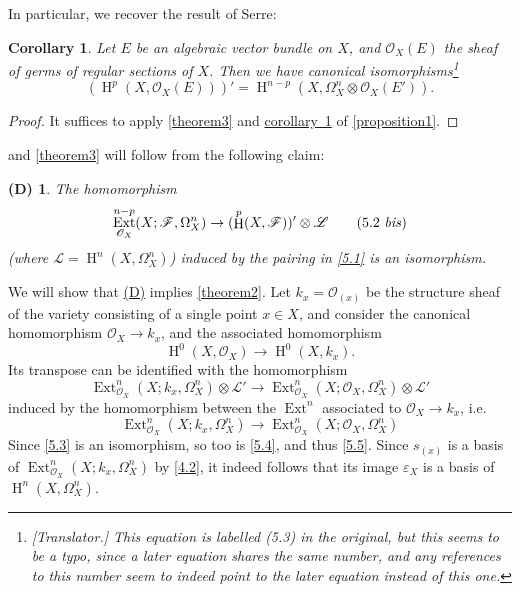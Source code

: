 \documentclass{article}
\theoremstyle{plain}
\newtheorem*{corollary*}{Corollary}
\newtheorem*{denv}{(D)}
\theoremstyle{definition}
\newcommand{\sh}{\mathscr}
\DeclareMathOperator{\Ext}{Ext}
\DeclareMathOperator{\HH}{H}
\newcommand{\oldpage}[1]{\marginpar{\footnotesize$\Big\vert$ \textit{p.~#1}}}
\begin{document}
In particular, we recover the result of Serre:

\begin{corollary*}
\label{theorem3corollary}
  \renewcommand*{\thefootnote}{\fnsymbol{footnote}}
  Let $E$ be an algebraic vector bundle on $X$, and $\sh{O}_X(E)$ the sheaf of germs of regular sections of $X$.
  Then we have canonical isomorphisms\footnote{\emph{[Translator.] This equation is labelled (5.3) in the original, but this seems to be a typo, since a later equation shares the same number, and any references to this number seem to indeed point to the later equation instead of this one.}}
  \[
    (\HH^p(X,\sh{O}_X(E)))' = \HH^{n-p}(X,\Omega_X^n\otimes\sh{O}_X(E')).
  \]
\end{corollary*}

\begin{proof}
  It suffices to apply \cref{theorem3} and \hyperref[proposition1corollary1]{corollary~1} of \cref{proposition1}.
\end{proof}

 and \cref{theorem3} will follow from the following claim:

\begin{denv}
\label{(D)}
  The homomorphism
  \[
  \label{5.2bis}
    \Ext_{\sh{O}_X}^{n-p}(X;\sh{F},\Omega_X^n) \to (\HH^p(X,\sh{F}))'\otimes\sh{L}
  \tag{5.2 \emph{bis}}
  \]
  (where $\sh{L}=\HH^n(X,\Omega_X^n)$) induced by the pairing in \cref{5.1} is an isomorphism.
\end{denv}

We will show that \hyperref[(D)]{(D)} implies \cref{theorem2}.
Let $k_x=\sh{O}_{(x)}$ be the structure sheaf of the variety consisting of a single point $x\in X$, and consider the canonical homomorphism $\sh{O}_X\to k_x$, and the associated homomorphism
\[
\label{5.3}
  \HH^0(X,\sh{O}_X) \to \HH^0(X,k_x).
\tag{5.3}
\]
Its transpose can be identified with the homomorphism
\[
\label{5.4}
  \Ext_{\sh{O}_X}^n(X;k_x,\Omega_X^n)\otimes\sh{L}' \to \Ext_{\sh{O}_X}^n(X;\sh{O}_X,\Omega_X^n)\otimes\sh{L}'
\tag{5.4}
\]
induced by the homomorphism between the $\Ext^n$ associated to $\sh{O}_X\to k_x$, i.e.
\[
\label{5.5}
  \Ext_{\sh{O}_X}^n(X;k_x,\Omega_X^n) \to \Ext_{\sh{O}_X}^n(X;\sh{O}_X,\Omega_X^n)
\tag{5.5}
\]
\oldpage{149-15}
Since \cref{5.3} is an isomorphism, so too is \cref{5.4}, and thus \cref{5.5}.
Since $s_{(x)}$ is a basis of $\Ext_{\sh{O}_X}^n(X;k_x,\Omega_X^n)$ by \cref{4.2}, it indeed follows that its image $\varepsilon_X$ is a basis of $\HH^n(X,\Omega_X^n)$.
\end{document}
